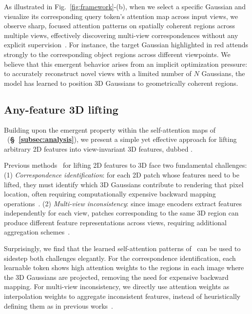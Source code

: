 As illustrated in Fig.~\ref{fig:framework}-(b), when we select a specific Gaussian and visualize its corresponding query token's attention map across input views, we observe sharp, focused attention patterns on spatially coherent regions across multiple views, effectively discovering multi-view correspondences without any explicit supervision~\cite{an2025cross}. For instance, the target Gaussian highlighted in red attends strongly to the corresponding object regions across different viewpoints. We believe that this emergent behavior arises from an implicit optimization pressure: to accurately reconstruct novel views with a limited number of $N$ Gaussians, the model has learned to position 3D Gaussians to geometrically coherent regions.

\subsection{Any-feature 3D lifting}

\label{subsec:feature_lifting}
Building upon the emergent property within the self-attention maps of \ours~(\textbf{\S~\ref{subsec:analysis}}), we present a simple yet effective approach for lifting arbitrary 2D features into view-invariant 3D features, dubbed \oursF.

Previous methods~\cite{zeid2025dino,marrie2025ludvig, cheng2024occam} for lifting 2D features to 3D face two fundamental challenges: (1) \textit{Correspondence identification}: for each 2D patch whose features need to be lifted, they must identify which 3D Gaussians contribute to rendering that pixel location, often requiring computationally expensive backward mapping operations~\cite{zeid2025dino, lee2025cf3, cheng2024occam, marrie2025ludvig, jun2025dr}. (2) \textit{Multi-view inconsistency}: since image encoders extract features independently for each view, patches corresponding to the same 3D region can produce different feature representations across views, requiring additional aggregation schemes~\cite{fan2024large, burgess2006spatial}.

Surprisingly, we find that the learned self-attention patterns of \ours\ can be used to sidestep both challenges elegantly. For the correspondence identification, each learnable token shows high attention weights to the regions in each image where the 3D Gaussians are projected, removing the need for expensive backward mapping. For multi-view inconsistency, we directly use attention weights as interpolation weights to aggregate inconsistent features, instead of heuristically defining them as in previous works~\cite{cheng2024occam}.

